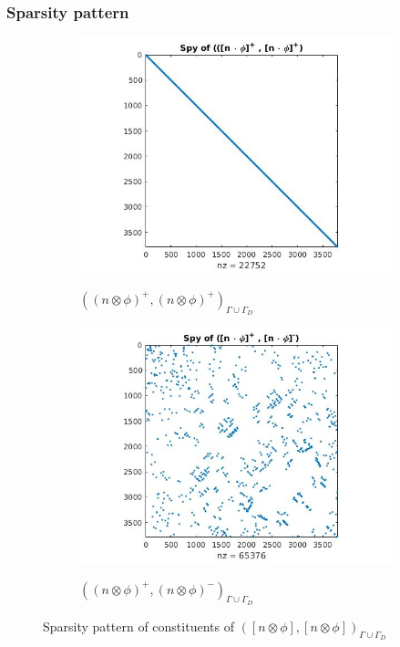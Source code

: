 \documentclass{beamer}
\begin{document}
\begin{frame}
\frametitle{Sparsity pattern}

\begin{figure}
  \begin{subfigure}{0.45\textwidth}
    \includegraphics[width=\linewidth]{figure21.jpg}
    \label{fig:figure21}
	\caption{$((n \otimes \phi)^+,(n \otimes \phi)^+)_{\Gamma \cup \Gamma_D}$}      
  \end{subfigure}
  \begin{subfigure}{0.45\textwidth}
    \includegraphics[width=\linewidth]{figure22.jpg}
    \label{fig:figure22}
	\caption{$((n \otimes \phi)^+,(n \otimes \phi)^-)_{\Gamma \cup \Gamma_D}$}      
  \end{subfigure}
\caption{Sparsity pattern of constituents of $([n \otimes \phi],[n \otimes \phi])_{\Gamma \cup \Gamma_D}$}
\label{figure_2_all}
\end{figure}

\end{frame}
\end{document}
